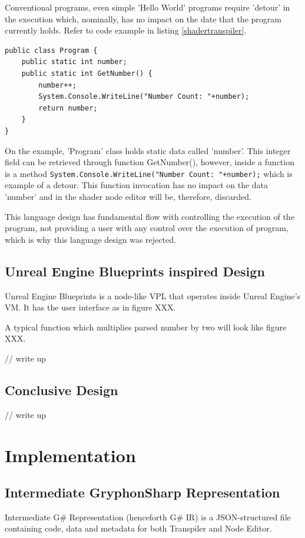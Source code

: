 \documentclass{article}
\begin{document}
Conventional programs, even simple 'Hello World' programs require 'detour' in the execution which, nominally, has no impact on the date that the program currently holds. Refer to code example in listing \ref{shadertranspiler}.
\begin{lstlisting}[frame=single, label=shadertranspiler, caption=Example Execution Detour]
public class Program {
    public static int number;
    public static int GetNumber() {
        number++;
        System.Console.WriteLine("Number Count: "+number);
        return number;
    }
}
\end{lstlisting}
On the example, 'Program' class holds static data called 'number'. This integer field can be retrieved through function GetNumber(), however, inside a function is a method \lstinline[columns=fixed]{System.Console.WriteLine("Number Count: "+number);} which is example of a detour. This function invocation has no impact on the data 'number' and in the shader node editor will be, therefore, discarded.

This language design has fundamental flow with controlling the execution of the program, not providing a user with any control over the execution of program, which is why this language design was rejected.

\cite{coronado_2020_visual}
\subsection{Unreal Engine Blueprints inspired Design}
Unreal Engine Blueprints is a node-like VPL that operates inside Unreal Engine's VM. It has the user interface as in figure XXX. 

A typical function which multiplies parsed number by two will look like figure XXX.

// write up
\subsection{Conclusive Design}
// write up\cite{8120404}




\section{Implementation}
\subsection{Intermediate GryphonSharp Representation}
Intermediate G\# Representation (henceforth G\# IR) is a JSON-structured file containing code, data and metadata for both Transpiler and Node Editor.
\end{document}
